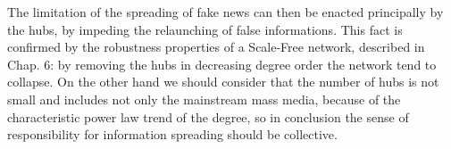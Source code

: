 \documentclass[11pt, twoside]{report}
\begin{document}
    The limitation of the spreading of fake news can then be enacted principally by the hubs, by impeding the relaunching of false informations.
    This fact is confirmed by the robustness properties of a Scale-Free network, described in Chap. 6: by removing the hubs in decreasing degree order the network tend to collapse.
    On the other hand we should consider that the number of hubs is not small and includes not only the mainstream mass media, because of the characteristic power law trend of the degree, so in conclusion the sense of responsibility for information spreading should be collective.



\printbibliography[title={References}]
\end{document}

